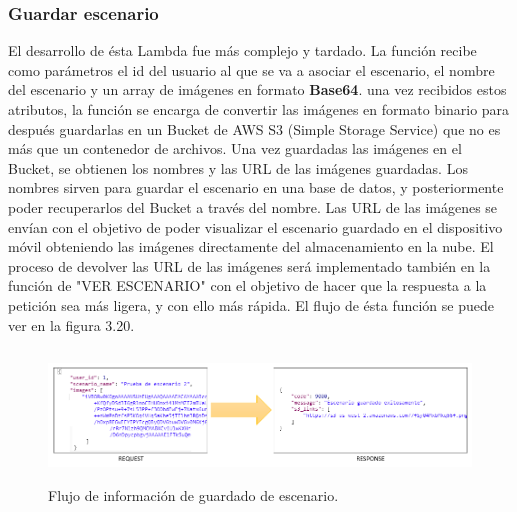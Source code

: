 \subsubsection{Guardar escenario}
El desarrollo de ésta Lambda fue más complejo y tardado. La función recibe como parámetros el id del usuario al que se va a asociar el escenario, el nombre del escenario y un array de imágenes en formato \textbf{Base64}. una vez recibidos estos atributos, la función se encarga de convertir las imágenes en formato binario para después guardarlas en un Bucket de AWS S3 (Simple Storage Service) que no es más que un contenedor de archivos. Una vez guardadas las imágenes en el Bucket, se obtienen los nombres y las URL de las imágenes guardadas. Los nombres sirven para guardar el escenario en una base de datos, y posteriormente poder recuperarlos del Bucket a través del nombre. Las URL de las imágenes se envían con el objetivo de poder visualizar el escenario guardado en el dispositivo móvil obteniendo las imágenes directamente del almacenamiento en la nube. El proceso de devolver las URL de las imágenes será implementado también en la función de "VER ESCENARIO" con el objetivo de hacer que la respuesta a la petición sea más ligera, y con ello más rápida. El flujo de ésta función se puede ver en la figura 3.20.

\begin{figure}[h!]
	\centering
	\includegraphics[width=15cm,height=3.5cm]{imagenes/desarrollo/arquitectura/STORESC_SUCCESS.png}
	\caption{Flujo de información de guardado de escenario.}
	\label{fig:regsuccess}
\end{figure}